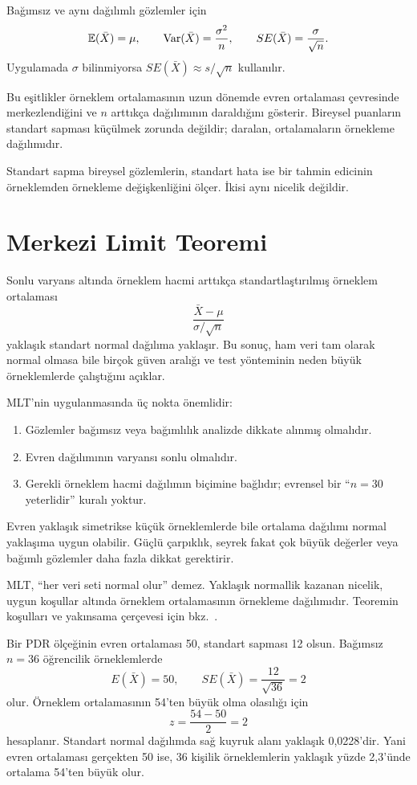 Bağımsız ve aynı dağılımlı gözlemler için
\[
\mathbb{E}(\bar X)=\mu,
\qquad
\operatorname{Var}(\bar X)=\frac{\sigma^2}{n},
\qquad
SE(\bar X)=\frac{\sigma}{\sqrt n}.
\]
Uygulamada $\sigma$ bilinmiyorsa $SE(\bar X)\approx s/\sqrt n$ kullanılır.

Bu eşitlikler örneklem ortalamasının uzun dönemde evren ortalaması çevresinde
merkezlendiğini ve $n$ arttıkça dağılımının daraldığını gösterir. Bireysel
puanların standart sapması küçülmek zorunda değildir; daralan, ortalamaların
örnekleme dağılımıdır.

\begin{mistakebox}
Standart sapma bireysel gözlemlerin, standart hata ise bir tahmin edicinin
örneklemden örnekleme değişkenliğini ölçer. İkisi aynı nicelik değildir.
\end{mistakebox}

\section{Merkezi Limit Teoremi}

Sonlu varyans altında örneklem hacmi arttıkça standartlaştırılmış örneklem
ortalaması
\[
\frac{\bar X-\mu}{\sigma/\sqrt n}
\]
yaklaşık standart normal dağılıma yaklaşır. Bu sonuç, ham veri tam olarak
normal olmasa bile birçok güven aralığı ve test yönteminin neden büyük
örneklemlerde çalıştığını açıklar.

MLT'nin uygulanmasında üç nokta önemlidir:

\begin{enumerate}
  \item Gözlemler bağımsız veya bağımlılık analizde dikkate alınmış olmalıdır.
  \item Evren dağılımının varyansı sonlu olmalıdır.
  \item Gerekli örneklem hacmi dağılımın biçimine bağlıdır; evrensel bir ``$n=30$ yeterlidir'' kuralı yoktur.
\end{enumerate}


Evren yaklaşık simetrikse küçük örneklemlerde bile ortalama dağılımı normal
yaklaşıma uygun olabilir. Güçlü çarpıklık, seyrek fakat çok büyük değerler veya
bağımlı gözlemler daha fazla dikkat gerektirir.

MLT, ``her veri seti normal olur'' demez. Yaklaşık normallik kazanan nicelik,
uygun koşullar altında örneklem ortalamasının örnekleme dağılımıdır.
Teoremin koşulları ve yakınsama çerçevesi için bkz.\
\cite{billingsley1995,dasgupta2011}.

\begin{ornek}
Bir PDR ölçeğinin evren ortalaması 50, standart sapması 12 olsun. Bağımsız
$n=36$ öğrencilik örneklemlerde
\[
E(\bar X)=50,
\qquad
SE(\bar X)=\frac{12}{\sqrt{36}}=2
\]
olur. Örneklem ortalamasının 54'ten büyük olma olasılığı için
\[
z=\frac{54-50}{2}=2
\]
hesaplanır. Standart normal dağılımda sağ kuyruk alanı yaklaşık 0,0228'dir.
Yani evren ortalaması gerçekten 50 ise, 36 kişilik örneklemlerin yaklaşık
yüzde 2,3'ünde ortalama 54'ten büyük olur.
\end{ornek}

